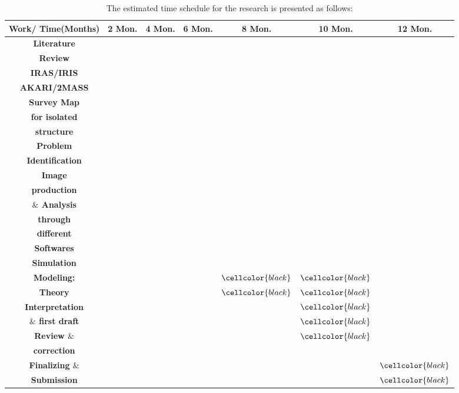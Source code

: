 \documentclass[fleqn,a4paper,12pt,oneside]{article}
\begin{document}
\begin{table}[H]
	\centering
	\caption{The estimated time schedule for the research is presented as follows:}
	\vspace{1 pt}
	\begin{tabular}{||c|c|c|c|c|c|c||}
		\hline
		\hline
		\textbf{Work/ Time(Months)} & \textbf{ 2 Mon.} & \textbf{4 Mon.} & \textbf{6 Mon.} & \textbf{8 Mon.} & \textbf{10 Mon.} & \textbf{12 Mon.}\\
	\hline
		\textbf{Literature} &\cellcolor{black}  & \cellcolor{black} &  &  &  & \\
			\textbf{Review} & \cellcolor{black}  & \cellcolor{black} &  &  &  & \\
	\hline
	\textbf{IRAS/IRIS} &  &\cellcolor{black}  &  &  &  & \\

		\textbf{AKARI/2MASS} &  & \cellcolor{black} &  &  &  & \\
		\textbf{Survey Map} &  &\cellcolor{black}  &  &  &  & \\
	\textbf{ for isolated } &  &\cellcolor{black}  &  &  &  & \\
	\textbf{  structure} &  &\cellcolor{black}  &  &  &  & \\
	\hline
	\textbf{Problem} &  &\cellcolor{black}  & \cellcolor{black} &  &  & \\
	\textbf{ Identification} &  &\cellcolor{black}  & \cellcolor{black} &  &  & \\
	\hline
	\textbf{Image  } &  & &\cellcolor{black}  &\cellcolor{black} &  &\\
		\textbf{ production } &  & &\cellcolor{black}  &\cellcolor{black} &  &\\
	\textbf{ $\&$ Analysis} &  & &\cellcolor{black}  &\cellcolor{black} &  &\\
		\textbf{through } &  & &\cellcolor{black}  &\cellcolor{black} &  &\\
	\textbf{   different} &  & &\cellcolor{black}  &\cellcolor{black} &  &\\
	\textbf{ Softwares} &  & & \cellcolor{black} &\cellcolor{black} &  &\\
	\hline
 \textbf{Simulation} &  & &  & \cellcolor{black} &  &\\
	\hline
		\textbf{ Modeling:} &  & &  &$\cellcolor{black}$ &$\cellcolor{black}$  &\\
		\textbf{  Theory} &  & &  & $\cellcolor{black}$& $\cellcolor{black}$ &\\
	\hline
	\textbf{ Interpretation} &  & &  & & $\cellcolor{black}$ &\\		\textbf{ 
			$\&$ first draft} &  & &  & & $\cellcolor{black}$ &\\
		\hline
		\textbf{ Review $\&$} &  & &  & & $\cellcolor{black}$ &\cellcolor{black}\\
		\textbf{ correction} &  & &  & & \cellcolor{black} &\cellcolor{black}\\
		\hline
		\textbf{Finalizing $\&$  } &  & &  & &  &$\cellcolor{black}$\\
		\textbf{ Submission} &  & &  & &  &$\cellcolor{black}$\\
		\hline
		\hline
		
	\end{tabular}
\end{table} 
\end{document}

